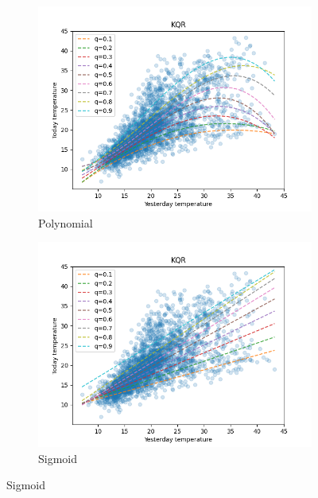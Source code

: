 \begin{figure}[!h]
\begin{subfigure}[b]{0.5\linewidth}
    \end{subfigure}
    \begin{subfigure}[b]{0.5\linewidth}
        \centering
        \includegraphics[width=1.1\textwidth]{images/melbourne_polynomial_kernel_quantile_regression.png}
        \caption{Polynomial} 
        \label{} 
        \vspace{4ex}
    \end{subfigure} 
    \begin{subfigure}[b]{0.5\linewidth}
        \centering
        \includegraphics[width=1.1\textwidth]{images/melbourne_sigmoid_kernel_quantile_regression.png}
        \caption{Sigmoid} 
        \label{} 
        \vspace{4ex}

\end{subfigure}
\end{figure}

